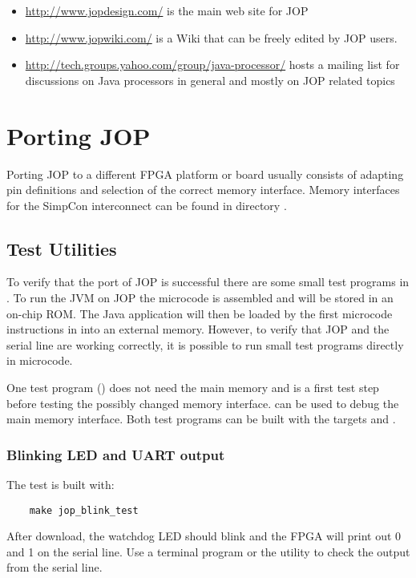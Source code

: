 \begin{itemize}
    \item \url{http://www.jopdesign.com/} is the main web site
        for JOP
    \item \url{http://www.jopwiki.com/} is a Wiki that can be
        freely edited by JOP users.
    \item
        \url{http://tech.groups.yahoo.com/group/java-processor/}
        hosts a mailing list for discussions on Java processors
        in general and mostly on JOP related topics
\end{itemize}


\section{Porting JOP}


Porting JOP to a different FPGA platform or board usually consists
of adapting pin definitions and selection of the correct memory
interface. Memory interfaces for the SimpCon interconnect can be
found in directory .

\subsection{Test Utilities}

To verify that the port of JOP is successful there are some small
test programs in . To run the JVM on JOP the
microcode  is assembled and will be stored in an
on-chip ROM. The Java application will then be loaded by the first
microcode instructions in  into an external memory.
However, to verify that JOP and the serial line are working
correctly, it is possible to run small test programs directly in
microcode.

One test program () does not need the main memory and
is a first test step before testing the possibly changed memory
interface.  can be used to debug the main memory
interface. Both test programs can be built with the 
targets  and .

\subsubsection{Blinking LED and UART output}


The test is built with:
%
\begin{lstlisting}
    make jop_blink_test
\end{lstlisting}
%
After download, the watchdog LED should blink and the FPGA will print
out 0 and 1 on the serial line. Use a terminal program or the utility
 to check the output from the serial line.

